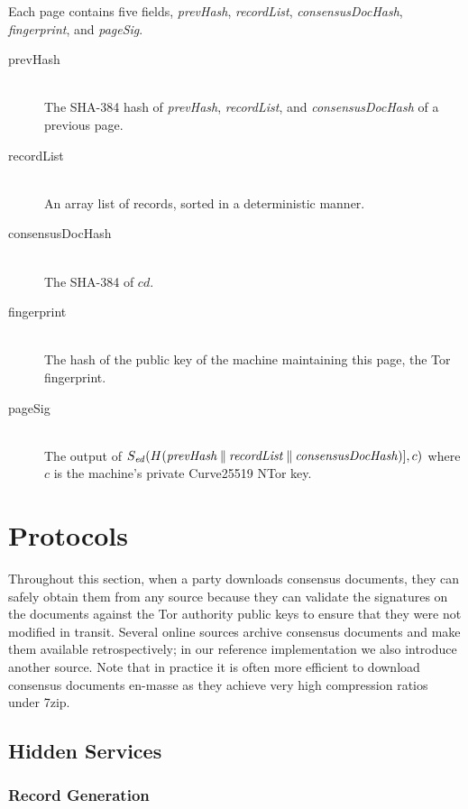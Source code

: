 Each page contains five fields, \emph{prevHash}, \emph{recordList}, \emph{consensusDocHash}, \emph{fingerprint}, and \emph{pageSig}.

\begin{description}
	\item[prevHash] \hfill \\
		The SHA-384 hash of \emph{prevHash}, \emph{recordList}, and \emph{consensusDocHash} of a previous page.
	\item[recordList] \hfill \\
		An array list of records, sorted in a deterministic manner.
	\item[consensusDocHash] \hfill \\
		The SHA-384 of $ cd $.
	\item[fingerprint] \hfill \\
		The hash of the public key of the machine maintaining this page, the Tor fingerprint.
	\item[pageSig] \hfill \\
		The output of $ S_{\mathit{ed}}(H(\mathit{prevHash} \mathbin{\|} \mathit{recordList} \mathbin{\|} \mathit{consensusDocHash})], c) $ where $ c $ is the machine's private Curve25519 NTor key.
\end{description}	
		
\section{Protocols}
\label{sec:Protocols}

Throughout this section, when a party downloads consensus documents, they can safely obtain them from any source because they can validate the signatures on the documents against the Tor authority public keys to ensure that they were not modified in transit. Several online sources archive consensus documents and make them available retrospectively; in our reference implementation we also introduce another source. Note that in practice it is often more efficient to download consensus documents en-masse as they achieve very high compression ratios under 7zip.


\subsection{Hidden Services}
\label{sec:ProtoHiddenServices}

\subsubsection{Record Generation}

